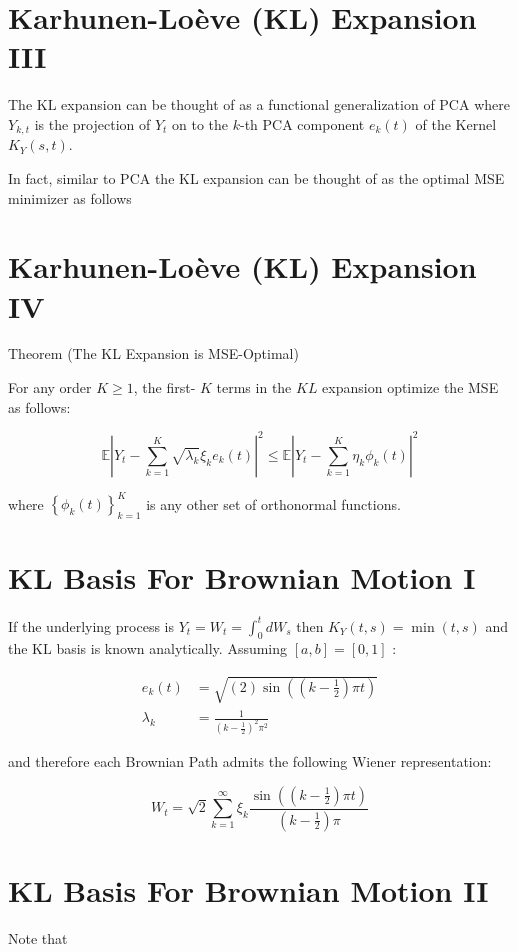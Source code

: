 \documentclass[11pt]{article}
\theoremstyle{plain} %
\theoremstyle{remark}
\begin{document}
\section*{Karhunen-Loève (KL) Expansion III}
The $\mathrm{KL}$ expansion can be thought of as a functional generalization of
PCA where $Y_{k, t}$ is the projection of $Y_{t}$ on to the $k$-th PCA component
$e_{k}(t)$ of the Kernel $K_{Y}(s, t)$.

In fact, similar to PCA the KL expansion can be thought of as the optimal MSE
minimizer as follows

\section*{Karhunen-Loève (KL) Expansion IV}
Theorem (The KL Expansion is MSE-Optimal)

For any order $K \geq 1$, the first- $K$ terms in the $K L$ expansion optimize
the MSE as follows:

$$
\mathbb{E}\left|Y_{t}-\sum_{k=1}^{K} \sqrt{\lambda_{k}} \xi_{k} e_{k}(t)\right|^{2} \leq \mathbb{E}\left|Y_{t}-\sum_{k=1}^{K} \eta_{k} \phi_{k}(t)\right|^{2}
$$

where $\left\{\phi_{k}(t)\right\}_{k=1}^{K}$ is any other set of orthonormal
functions.

\section*{KL Basis For Brownian Motion I}
If the underlying process is $Y_{t}=W_{t}=\int_{0}^{t} d W_{s}$ then $K_{Y}(t,
s)=\min (t, s)$ and the $\mathrm{KL}$ basis is known analytically. Assuming $[a,
b]=[0,1]$ :

$$
\begin{aligned}
e_{k}(t) & =\sqrt{(2) \sin \left(\left(k-\frac{1}{2}\right) \pi t\right)} \\
\lambda_{k} & =\frac{1}{\left(k-\frac{1}{2}\right)^{2} \pi^{2}}
\end{aligned}
$$

and therefore each Brownian Path admits the following Wiener representation:

$$
W_{t}=\sqrt{2} \sum_{k=1}^{\infty} \xi_{k} \frac{\sin \left(\left(k-\frac{1}{2}\right) \pi t\right)}{\left(k-\frac{1}{2}\right) \pi}
$$

\section*{KL Basis For Brownian Motion II}
Note that
\end{document}
